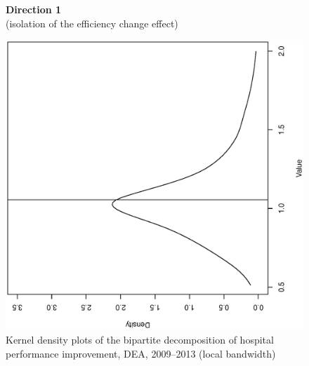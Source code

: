 \documentclass[11pt,a4paper,oneside]{article}
\begin{document}
\begin{figure}[htbp]
  \centering
  \caption{Kernel density plots of the bipartite decomposition of hospital performance improvement, DEA, 2009--2013 (local bandwidth)}
  \label{fig:bipartite_densities_DEA_local}
  {{\bf Direction 1} \\{\footnotesize (isolation of the efficiency change effect)} }\\
  \hspace{-35mm}
  \begin{minipage}[c]{0.30\textwidth}
  \centering
  \begin{turn}{-90}
  \includegraphics[width=\textwidth,height=1.0\textwidth]{Direction.1/gml_EC_DEA_locfit_2009-2013.ps}
  \end{turn}
  \end{minipage}
  \begin{minipage}[c]{0.30\textwidth}
  \centering

\end{minipage}
\end{figure}
\end{document}

